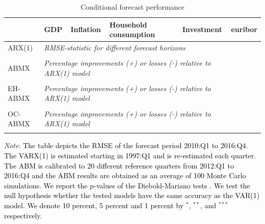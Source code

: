 {\begin{table}[!h]
	\caption{Conditional forecast performance } 
	\label{table:rmse_abmx}
	\centering
		\begin{tabular}{llllll}
			\toprule
			& GDP & Inflation & Household consumption & Investment & euribor\\
			\midrule
			ARX(1) & \multicolumn{4}{l}{\textit{RMSE-statistic for different forecast horizons}} \\ \midrule
			 \\ \midrule
           ABMX & \multicolumn{4}{l}{\textit{Percentage improvements (+) or losses (-) relative to ARX(1) model}} \\ \midrule
           	 \\ \midrule
           EH-ABMX & \multicolumn{4}{l}{\textit{Percentage improvements (+) or losses (-) relative to ARX(1) model}} \\ \midrule
			 \\ \midrule
			OC-ABMX & \multicolumn{4}{l}{\textit{Percentage improvements (+) or losses (-) relative to ARX(1) model}} \\ \midrule
			
			\\ \bottomrule
		\end{tabular}
	\begin{tablenotes}
		\footnotesize \item \textit{Note}: \textcolor{black}{The table depicts the RMSE of the forecast period 2010:Q1 to 201\textcolor{black}{6}:Q4. The VARX(1) is estimated starting in 1997:Q1 and is re-estimated each quarter. The ABM is calibrated to \textcolor{black}{20} different reference quarters from 2012:Q1 to \textcolor{black}{2016:Q4} and the ABM results are obtained as an average of 100 Monte Carlo simulations. We report the p-values of the Diebold-Mariano tests \citep{harveyTestingEqualityPrediction1997}.  We test the null hypothesis whether the tested models have the same accuracy as the VAR(1) model. We denote  10 percent, 5 percent and 1 percent by $^{*}$, $^{**}$, and $^{***}$ respectively.}
	\end{tablenotes}
\end{table}
\pagebreak
}
